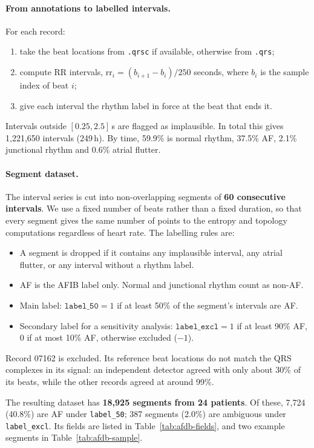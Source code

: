 \documentclass[11pt]{article}
\newcommand{\var}[1]{\texttt{#1}}
\begin{document}
\paragraph{From annotations to labelled intervals.} For each record:
\begin{enumerate}
  \item take the beat locations from \var{.qrsc} if available, otherwise from
  \var{.qrs};
  \item compute RR intervals,
  $\mathrm{rr}_i = (b_{i+1} - b_i)/250$ seconds, where $b_i$ is the sample
  index of beat $i$;
  \item give each interval the rhythm label in force at the beat that ends it.
\end{enumerate}
Intervals outside $[0.25, 2.5]$\,s are flagged as implausible. In total this
gives 1{,}221{,}650 intervals (249\,h). By time, 59.9\% is normal rhythm,
37.5\% AF, 2.1\% junctional rhythm and 0.6\% atrial flutter.

\paragraph{Segment dataset.} The interval series is cut into non-overlapping
segments of \textbf{60 consecutive intervals}. We use a fixed number of beats
rather than a fixed duration, so that every segment gives the same number of
points to the entropy and topology computations regardless of heart rate. The
labelling rules are:
\begin{itemize}
  \item A segment is dropped if it contains any implausible interval, any
  atrial flutter, or any interval without a rhythm label.
  \item AF is the AFIB label only. Normal and junctional rhythm count as
  non-AF.
  \item Main label: $\var{label\_50} = 1$ if at least 50\% of the segment's
  intervals are AF.
  \item Secondary label for a sensitivity analysis: $\var{label\_excl} = 1$
  if at least 90\% AF, $0$ if at most 10\% AF, otherwise excluded ($-1$).
\end{itemize}
Record 07162 is excluded. Its reference beat locations do not match the QRS
complexes in its signal: an independent detector agreed with only about 30\%
of its beats, while the other records agreed at around 99\%.

The resulting dataset has \textbf{18{,}925 segments from 24 patients}. Of
these, 7{,}724 (40.8\%) are AF under \var{label\_50}; 387 segments (2.0\%)
are ambiguous under \var{label\_excl}. Its fields are listed in
Table~\ref{tab:afdb-fields}, and two example segments in
Table~\ref{tab:afdb-sample}.
\end{document}
